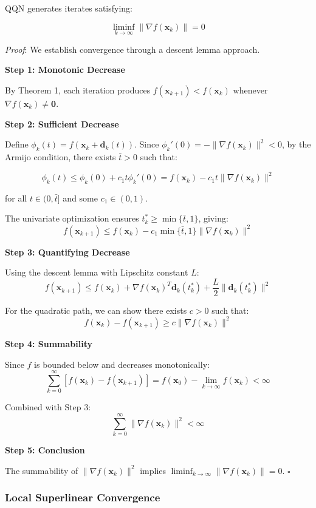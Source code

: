 QQN generates iterates satisfying:

\[\liminf_{k \to \infty} \|\nabla f(\mathbf{x}_k)\| = 0\]

\emph{Proof}: We establish convergence through a descent lemma approach.

\textbf{Step 1: Monotonic Decrease}

By Theorem 1, each iteration produces \(f(\mathbf{x}_{k+1}) < f(\mathbf{x}_k)\) whenever \(\nabla f(\mathbf{x}_k) \neq \mathbf{0}\).

\textbf{Step 2: Sufficient Decrease}

Define \(\phi_k(t) = f(\mathbf{x}_k + \mathbf{d}_k(t))\). Since \(\phi_k'(0) = -\|\nabla f(\mathbf{x}_k)\|^2 < 0\), by the Armijo condition, there exists \(\bar{t} > 0\) such that:

\[\phi_k(t) \leq \phi_k(0) + c_1 t \phi_k'(0) = f(\mathbf{x}_k) - c_1 t \|\nabla f(\mathbf{x}_k)\|^2\]

for all \(t \in (0, \bar{t}]\) and some \(c_1 \in (0, 1)\).

The univariate optimization ensures \(t_k^* \geq \min\{\bar{t}, 1\}\), giving:
\[f(\mathbf{x}_{k+1}) \leq f(\mathbf{x}_k) - c_1 \min\{\bar{t}, 1\} \|\nabla f(\mathbf{x}_k)\|^2\]

\textbf{Step 3: Quantifying Decrease}

Using the descent lemma with Lipschitz constant \(L\):
\[f(\mathbf{x}_{k+1}) \leq f(\mathbf{x}_k) + \nabla f(\mathbf{x}_k)^T \mathbf{d}_k(t_k^*) + \frac{L}{2}\|\mathbf{d}_k(t_k^*)\|^2\]

For the quadratic path, we can show there exists \(c > 0\) such that:
\[f(\mathbf{x}_k) - f(\mathbf{x}_{k+1}) \geq c\|\nabla f(\mathbf{x}_k)\|^2\]

\textbf{Step 4: Summability}

Since \(f\) is bounded below and decreases monotonically:
\[\sum_{k=0}^{\infty} [f(\mathbf{x}_k) - f(\mathbf{x}_{k+1})] = f(\mathbf{x}_0) - \lim_{k \to \infty} f(\mathbf{x}_k) < \infty\]

Combined with Step 3:
\[\sum_{k=0}^{\infty} \|\nabla f(\mathbf{x}_k)\|^2 < \infty\]

\textbf{Step 5: Conclusion}

The summability of \(\|\nabla f(\mathbf{x}_k)\|^2\) implies \(\liminf_{k \to \infty} \|\nabla f(\mathbf{x}_k)\| = 0\). \(\square\)

\hypertarget{local-superlinear-convergence}{%
\subsubsection{Local Superlinear Convergence}\label{local-superlinear-convergence}}

